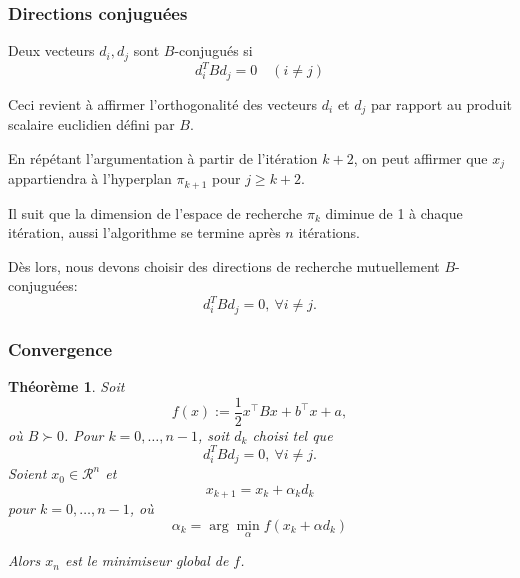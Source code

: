 \documentclass[usepdftitle=false,aspectratio=169]{beamer}
\newtheorem{thm}{Théorème}
\def\cR{\mathcal{R}}
\begin{document}
\begin{frame}
\frametitle{Directions conjuguées}

\begin{definition}
Deux vecteurs $d_i, d_j$ sont $B$-conjugu\'es si
$$
d_i^T B d_j = 0 \quad (i \neq j)
$$
\end{definition}
Ceci revient à affirmer l'orthogonalité des vecteurs $d_i$ et $d_j$ par rapport au produit scalaire euclidien défini par $B$.


\mbox{}

En répétant l'argumentation à partir de l'itération $k+2$, on peut affirmer que $x_j$ appartiendra à l'hyperplan $\pi_{k+1}$ pour $j \geq k+2$.

\mbox{}

Il suit que la dimension de l'espace de recherche $\pi_k$ diminue de 1 à chaque itération, aussi l'algorithme se termine après $n$ itérations.

\mbox{}

Dès lors, nous devons choisir des directions de recherche mutuellement $B$-conjuguées:
$$
d_i^T B d_j = 0,\ \forall i \ne j.
$$


\end{frame}

\begin{frame}
\frametitle{Convergence}

\begin{thm}
Soit
$$
f(x) := \frac{1}{2}x^\top Bx + b^\top x + a,
$$
où $B \succ 0$.
Pour $k = 0,\ldots, n-1$, soit $d_k$ choisi tel que
$$
d_i^T B d_j = 0, \ \forall i \ne j.
$$
Soient $x_0 \in \cR^n$ et
$$
x_{k+1} = x_k + \alpha_k d_k
$$
pour $k = 0,\ldots, n - 1$, où
$$
\alpha_k = \arg \min_{\alpha} f(x_k + \alpha d_k)
$$

Alors $x_n$ est le minimiseur global de $f$.
\end{thm}

\end{frame}


\end{document}
